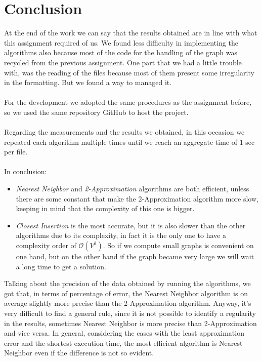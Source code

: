 \section{Conclusion}

At the end of the work we can say that the results obtained are in line with what this assignment required of us.
We found less difficulty in implementing the algorithms also because most of the code for the handling of the graph was recycled from the previous assignment.
One part that we had a little trouble with, was the reading of the files because most of them present some irregularity in the formatting. But we found a way to managed it.\\ \\ \noindent
For the development we adopted the same procedures as the assignment before, so we used the same repository GitHub to host the project.\\ \\ \noindent
Regarding the measurements and the results we obtained, in this occasion we repeated each algorithm multiple times until we reach an  aggregate time of 1 sec per file.\\ \\ \noindent
In conclusion:
\begin{itemize}
    \item \textit{Nearest Neighbor} and \textit{2-Approximation} algorithms are both efficient, unless there are some constant that make the 2-Approximation algorithm more slow, keeping in mind that the complexity of this one is bigger.
    \item \textit{Closest Insertion} is the most accurate, but it is also slower than the other algorithms due to its complexity, in fact it is the only one to have a complexity order of $\mathcal{O}(V^3)$. So if we compute small graphs is convenient on one hand, but on the other hand if the graph became very large we will wait a long time to get a solution.
\end{itemize}
\noindent
Talking about the precision of the data obtained by running the algorithms, we got that, in terms of percentage of error, the Nearest Neighbor algorithm is on average slightly more precise than the 2-Approximation algorithm. Anyway, it's very difficult to find a general rule, since it is not possible to identify a regularity in the results, sometimes Nearest Neighbor is more precise than 2-Approximation and vice versa.
In general, considering the cases with the least approximation error and the shortest execution time, the most efficient algorithm is Nearest Neighbor even if the difference is not so evident.